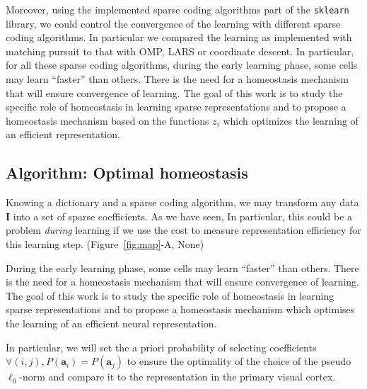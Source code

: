 \documentclass[a4paper, 11pt, draft]{article} %
\newcommand{\coef}{\mathbf{a}} %
\newcommand{\image}{\mathbf{I}} %
\newcommand{\seeFig}[1]{Figure~\ref{fig:#1}}%
\begin{document}
Moreover, using the implemented sparse coding algorithms part of the \verb+sklearn+ library, we could control the convergence of the learning with different sparse coding algorithms. In particular we compared the learning as implemented with matching pursuit to that with OMP, LARS or coordinate descent. 
In particular, for all these sparse coding algorithms, during the early learning phase, some cells may learn ``faster'' than others. There is the need for a homeostasis mechanism that will ensure convergence of learning. The goal of this work is to study the specific role of homeostasis in learning sparse representations and to propose a homeostasis mechanism based on the functions $z_i$ which optimizes the learning of an efficient representation.%
\subsection{Algorithm: Optimal homeostasis}\label{HEH}

Knowing a dictionary and a sparse coding algorithm, we may transform any data $\image$ into a set of sparse coefficients. As we have seen, 
In particular, this could be a problem \emph{during} learning if we use the cost to measure representation efficiency for this learning step. 
 (\seeFig{map}-A, None)


During the early learning phase, some cells may learn ``faster'' than others. There is the need for a homeostasis mechanism that will ensure convergence of learning. The goal of this work is to study the specific role of homeostasis in learning sparse representations and to propose a homeostasis mechanism which optimises the learning of an efficient neural representation. 

In particular, we will set the a priori probability of selecting coefficients {\color{BrickRed} $\forall (i,j), P(\coef_i)=P(\coef_j)$} to ensure the optimality of the choice of the pseudo $\ell_0$-norm and compare it to the representation in the primary visual cortex.%
\end{document}
